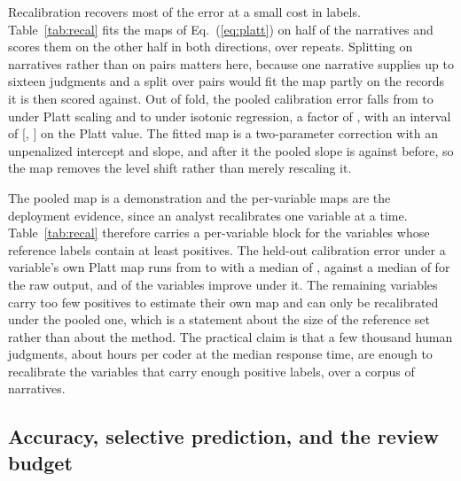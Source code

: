Recalibration recovers most of the error at a small cost in labels. Table~\ref{tab:recal}
fits the maps of Eq.~(\ref{eq:platt}) on half of the narratives and scores them on the other
half in both directions, over \RecalRepeats{} repeats. Splitting on narratives rather than on
pairs matters here, because one narrative supplies up to sixteen judgments and a split over
pairs would fit the map partly on the records it is then scored against. Out of fold, the
pooled calibration error falls from \RecalRawECE{} to \RecalPlattECE{} under Platt scaling and
to \RecalIsoECE{} under isotonic regression, a factor of \RecalIsoGain{}, with an interval of
[\RecalPlattECElo{}, \RecalPlattECEhi{}] on the Platt value. The fitted map is a two-parameter
correction with an unpenalized intercept and slope, and after it the pooled slope is
\RecalPlattSlope{} against \GoldSlope{} before, so the map removes the level shift rather than
merely rescaling it.

The pooled map is a demonstration and the per-variable maps are the deployment evidence, since
an analyst recalibrates one variable at a time. Table~\ref{tab:recal} therefore carries a
per-variable block for the \RecalPerVarN{} variables whose reference labels contain at least
\RecalMinPositives{} positives. The held-out calibration error under a variable's own Platt
map runs from \RecalPerVarECELo{} to \RecalPerVarECEHi{} with a median of
\RecalPerVarECEMedian{}, against a median of \RecalPerVarRawMedian{} for the raw output, and
\RecalPerVarNImproved{} of the \RecalPerVarN{} variables improve under it. The remaining
\RecalPooledOnlyN{} variables carry too few positives to estimate their own map and can only be
recalibrated under the pooled one, which is a statement about the size of the reference set
rather than about the method. The practical claim is that a few thousand human judgments, about
\CoderHours{} hours per coder at the median response time, are enough to recalibrate the
variables that carry enough positive labels, over a corpus of \Ncorpus{} narratives.





\subsection{Accuracy, selective prediction, and the review budget}
\label{sec:res-accuracy}

